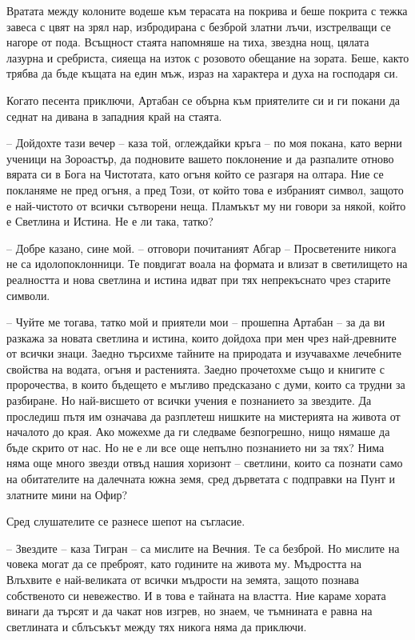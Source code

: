 Вратата между колоните водеше към терасата на покрива и беше покрита с тежка
завеса с цвят на зрял нар, избродирана с безброй златни лъчи, изстрелващи се
нагоре от пода. Всъщност стаята напомняше на тиха, звездна нощ, цялата лазурна и
сребриста, сияеща на изток с розовото обещание на зората. Беше, както трябва да
бъде къщата на един мъж, израз на характера и духа на господаря си.

Когато песента приключи, Артабан се обърна към приятелите си и ги покани да
седнат на дивана в западния край на стаята.

-- Дойдохте тази вечер -- каза той, оглеждайки кръга -- по моя покана, като
верни ученици на Зороастър, да подновите вашето поклонение и да разпалите отново
вярата си в Бога на Чистотата, като огъня който се разгаря на олтара. Ние се
покланяме не пред огъня, а пред Този, от който това е избраният символ, защото е
най-чистото от всички сътворени неща. Пламъкът му ни говори за някой, който е
Светлина и Истина. Не е ли така, татко?

-- Добре казано, сине мой. -- отговори почитаният Абгар -- Просветените никога
не са идолопоклонници. Те повдигат воала на формата и влизат в светилището на
реалността и нова светлина и истина идват при тях непрекъснато чрез старите
символи.

-- Чуйте ме тогава, татко мой и приятели мои -- прошепна Артабан -- за да ви
разкажа за новата светлина и истина, които дойдоха при мен чрез най-древните от
всички знаци. Заедно търсихме тайните на природата и изучавахме лечебните
свойства на водата, огъня и растенията. Заедно прочетохме също и книгите с
пророчества, в които бъдещето е мъгливо предсказано с думи, които са трудни за
разбиране. Но най-висшето от всички учения е познанието за звездите. Да
проследиш пътя им означава да разплетеш нишките на мистерията на живота от
началото до края. Ако можехме да ги следваме безпогрешно, нищо нямаше да бъде
скрито от нас. Но не е ли все още непълно познанието ни за тях? Нима няма още
много звезди отвъд нашия хоризонт -- светлини, които са познати само на
обитателите на далечната южна земя, сред дърветата с подправки на Пунт и
златните мини на Офир?

Сред слушателите се разнесе шепот на съгласие.

-- Звездите -- каза Тигран -- са мислите на Вечния. Те са безброй. Но мислите на
човека могат да се преброят, като годините на живота му. Мъдростта на Влъхвите е
най-великата от всички мъдрости на земята, защото познава собственото си
невежество. И в това е тайната на властта. Ние караме хората винаги да търсят и
да чакат нов изгрев, но знаем, че тъмнината е равна на светлината и сблъсъкът
между тях никога няма да приключи.


